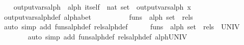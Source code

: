 \begin{isabellebody}
\isanewline
\ \ \isamarkupfalse%
\ output{}vars{}alph\ {}{}\ {}alph\ itself\ {}\ nat\ set{}\ \ {}output{}vars{}alph\ x\ {}\ {}{}{}{}\isanewline
\isanewline
\ \ \isamarkupfalse%
\ output{}vars{}alph{}def\ {}alphabet{}\isanewline
\isanewline
\ \ \isamarkupfalse%
%
\isadelimproof
\ %
\endisadelimproof
%
\isatagproof
{}\isamarkupfalse%
\isanewline
\ \ \ \ \isamarkupfalse%
\ {}{}funs\ {}{}\ alph\ set{}\ {}\ rels\ {}\ {}{}{}\isanewline
\ \ \ \ \ \ \isamarkupfalse%
\ {}auto\ simp\ add{}\ funs{}alph{}def\ rels{}alph{}def{}\isanewline
\isanewline
\ \ \ \ \isamarkupfalse%
\ {}{}funs\ {}{}\ alph\ set{}\ {}\ rels\ {}\ UNIV{}\isanewline
\ \ \ \ \ \ \isamarkupfalse%
\ {}auto\ simp\ add{}\ funs{}alph{}def\ rels{}alph{}def\ alph{}UNIV{}\isanewline

\end{isabellebody}
